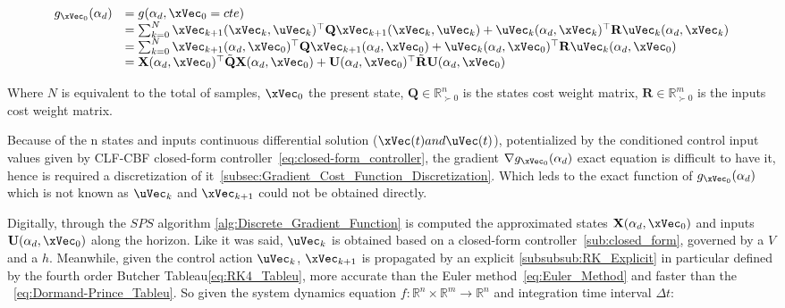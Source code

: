 \begin{equation}
    \begin{array}{ll}
        g_{\xVec_0}(\alpha_d) &= g(\alpha_d, \xVec_0 = cte)  \\   
        &= \sum_{k=0}^{N}\xVec_{k+1}(\xVec_k,\uVec_k)^{\top}\mathbf{Q}\xVec_{k+1}(\xVec_k,\uVec_k) +  \uVec_k(\alpha_d,\xVec_k)^{\top}\mathbf{R}\uVec_k(\alpha_d,\xVec_k) \\
        &= \sum_{k=0}^{N}\xVec_{k+1}(\alpha_d,\xVec_0)^{\top}\mathbf{Q}\xVec_{k+1}(\alpha_d,\xVec_0) +  \uVec_k(\alpha_d,\xVec_0)^{\top}\mathbf{R}\uVec_k(\alpha_d,\xVec_0) \\
        &= \mathbf{X}(\alpha_d,\xVec_0)^{\top}\tilde{\mathbf{Q}}\mathbf{X}(\alpha_d,\xVec_0) +  \mathbf{U}(\alpha_d,\xVec_0)^{\top}\tilde{\mathbf{R}}\mathbf{U}(\alpha_d,\xVec_0)
    \end{array}
    \label{eq:Cost_Function_Alpha}
\end{equation}

Where \(N\) is equivalent to the total of samples, \(\xVec_0\) the present state, \(\mathbf{Q} \in \mathbb{R}^n_{\succ 0}\) is the states cost weight matrix, \(\mathbf{R} \in \mathbb{R}^m_{\succ 0}\) is the inputs cost weight matrix.  \par

Because of the n states and inputs continuous differential solution (\(\xVec(t) and \uVec(t)\)), potentialized by the conditioned control input values given by CLF-CBF closed-form controller~\ref{eq:closed-form_controller}, the gradient \(\nabla g_{\xVec_0}(\alpha_d)\) exact equation is difficult to have it, hence is required a discretization of it~\ref{subsec:Gradient_Cost_Function_Discretization}. Which leds to the exact function of \(g_{\xVec_0}(\alpha_d)\) which is not known as \(\uVec_k\) and \(\xVec_{k+1}\) could not be obtained directly.\par 
Digitally, through the \(SPS\) algorithm \ref{alg:Discrete_Gradient_Function} is computed the approximated states \(\mathbf{X}(\alpha_d,\xVec_0)\) and inputs \(\mathbf{U}(\alpha_d,\xVec_0)\) along the horizon. Like it was said, \(\uVec_k\) is obtained based on a closed-form  controller~\ref{sub:closed_form}, governed by a  \(V\) and a  \(h\). Meanwhile, given the control action \(\uVec_k\), \(\xVec_{k+1}\) is propagated by an explicit \ref{subsubsub:RK_Explicit} in particular defined by the fourth order  Butcher Tableau\ref{eq:RK4_Tableu}, more accurate than the Euler method~\ref{eq:Euler_Method} and faster than the ~\ref{eq:Dormand-Prince_Tableu}. So given the system dynamics equation \(f:\mathbb{R}^n \times \mathbb{R}^m \to \mathbb{R}^n\) and integration time interval \(\Delta t\):


